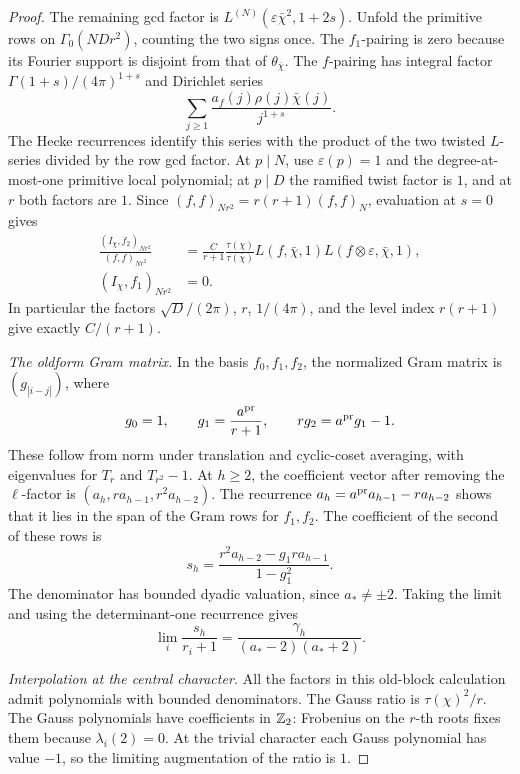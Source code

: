 \begin{proof}
The remaining gcd factor is
\(L^{(N)}(\varepsilon\bar\chi^2,1+2s)\).
Unfold the primitive rows on \(\Gamma_0(NDr^2)\), counting the
two signs once. The \(f_1\)-pairing is zero because its Fourier
support is disjoint from that of \(\theta_{\bar\chi}\).
The \(f\)-pairing has integral factor
\(\Gamma(1+s)/(4\pi)^{1+s}\) and Dirichlet series
\[
 \sum_{j\ge1}\frac{a_f(j)\rho(j)\bar\chi(j)}{j^{1+s}}.
\]
The Hecke recurrences identify this series with the product
of the two twisted \(L\)-series divided by the row gcd factor.
At \(p\mid N\), use \(\varepsilon(p)=1\) and the degree-at-most-one
primitive local polynomial; at \(p\mid D\) the ramified twist
factor is \(1\), and at \(r\) both factors are \(1\).
Since \((f,f)_{Nr^2}=r(r+1)(f,f)_N\), evaluation at \(s=0\) gives
\begin{equation}\label{tame:old-pairings}
 \begin{split}
 \frac{(I_\chi,f_2)_{Nr^2}}{(f,f)_{Nr^2}}
    &=\frac{C}{r+1}\frac{\tau(\chi)}{\tau(\bar\chi)}
          L(f,\bar\chi,1)L(f\otimes\varepsilon,\bar\chi,1),\\
 (I_\chi,f_1)_{Nr^2}&=0.
 \end{split}
\end{equation}
In particular the factors \(\sqrt D/(2\pi)\), \(r\),
\(1/(4\pi)\), and the level index \(r(r+1)\) give exactly
\(C/(r+1)\).

\emph{The oldform Gram matrix.}
In the basis \(f_0,f_1,f_2\), the normalized Gram matrix is
\((g_{|i-j|})\), where
\[
 g_0=1,\qquad
 g_1=\frac{a^{\rm pr}}{r+1},\qquad
 rg_2=a^{\rm pr}g_1-1.
\]
These follow from norm under translation and cyclic-coset
averaging, with eigenvalues for \(T_r\) and \(T_{r^2}-1\).
At \(h\ge2\), the coefficient vector after removing the
\(\ell\)-factor is
\((a_h,ra_{h-1},r^2a_{h-2})\).
The recurrence \(a_h=a^{\rm pr}a_{h-1}-ra_{h-2}\) shows that
it lies in the span of the Gram rows for \(f_1,f_2\).
The coefficient of the second of these rows is
\[
 s_h=\frac{r^2a_{h-2}-g_1ra_{h-1}}{1-g_1^2}.
\]
The denominator has bounded dyadic valuation, since
\(a_*\ne\pm2\). Taking the limit and using the determinant-one
recurrence gives
\begin{equation}\label{tame:gram-limit}
 \lim_i\frac{s_h}{r_i+1}
   =\frac{\gamma_h}{(a_*-2)(a_*+2)}.
\end{equation}

\emph{Interpolation at the central character.}
All the factors in this old-block calculation admit polynomials
with bounded denominators. The Gauss ratio is
\(\tau(\chi)^2/r\). The Gauss polynomials have coefficients in
\(\mathbb Z_2\): Frobenius on the \(r\)-th roots fixes
them because \(\lambda_i(2)=0\). At the trivial character each
Gauss polynomial has value \(-1\), so the limiting augmentation
of the ratio is \(1\).


\end{proof}
